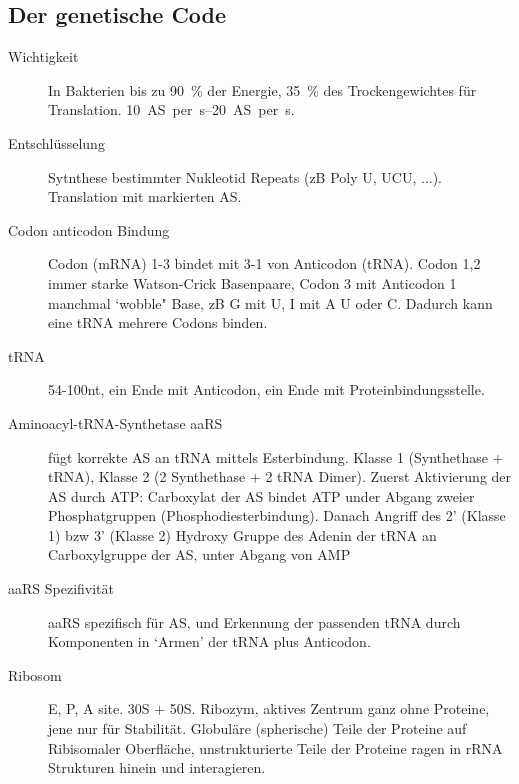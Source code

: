 \documentclass[a4paper,twocolumn,usegeometry,english,fontsize=6,DIV=16]{scrartcl}
\begin{document}
\subsection{Der genetische Code}

\begin{description}
	\item[Wichtigkeit] In Bakterien bis zu \SI{90}{\percent} der Energie,
		\SI{35}{\percent} des Trockengewichtes für Translation.
		\SIrange{10}{20}{AS per s}.
	\item[Entschlüsselung] Sytnthese bestimmter Nukleotid Repeats (zB Poly
		U, UCU, ...).  Translation mit markierten AS.
	\item[Codon anticodon Bindung] Codon (mRNA) 1-3 bindet mit 3-1 von
		Anticodon (tRNA). Codon 1,2 immer starke Watson-Crick
		Basenpaare, Codon 3 mit Anticodon 1 manchmal `wobble" Base, zB
		G mit U, I mit A U oder C. Dadurch kann eine tRNA mehrere
		Codons binden.
	\item[tRNA] 54-100nt, ein Ende mit Anticodon, ein Ende mit
		Proteinbindungsstelle.
	\item[Aminoacyl-tRNA-Synthetase aaRS] fügt korrekte AS an tRNA mittels
		Esterbindung. Klasse 1 (Synthethase + tRNA), Klasse 2 (2
		Synthethase + 2 tRNA Dimer). Zuerst Aktivierung der AS durch
		ATP: Carboxylat der AS bindet ATP under Abgang zweier
		Phosphatgruppen (Phosphodiesterbindung). Danach Angriff des 2'
		(Klasse 1) bzw 3' (Klasse 2) Hydroxy Gruppe des Adenin der tRNA
		an Carboxylgruppe der AS, unter Abgang von AMP
	\item[aaRS Spezifivität] aaRS spezifisch für AS, und Erkennung der
		passenden tRNA durch Komponenten in `Armen' der tRNA plus
		Anticodon.
	\item[Ribosom] E, P, A site. 30S + 50S. Ribozym, aktives Zentrum ganz
		ohne Proteine, jene nur für Stabilität. Globuläre (spherische)
		Teile der Proteine auf Ribisomaler Oberfläche, unstrukturierte
		Teile der Proteine ragen in rRNA Strukturen hinein und
		interagieren.
\end{description}
\end{document}
